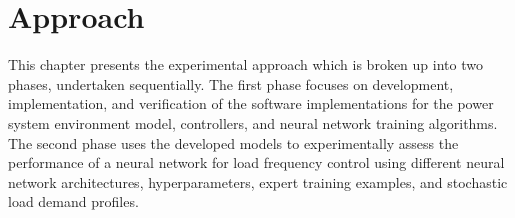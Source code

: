 \chapter{Approach}
This chapter presents the experimental approach which is broken up into two phases, undertaken sequentially. The first phase focuses on development, implementation, and verification of the software implementations for the power system environment model, controllers, and neural network training algorithms. The second phase uses the developed models to experimentally assess the performance of a neural network for load frequency control using different neural network architectures, hyperparameters, expert training examples, and stochastic load demand profiles.






